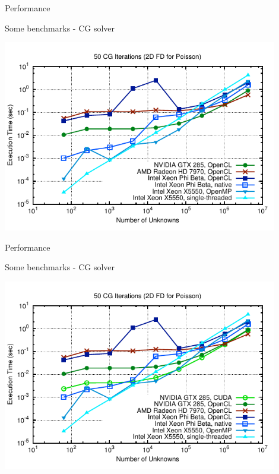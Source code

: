 \begin{frame}{Performance}
\begin{block}{Some benchmarks - CG solver}
  \begin{center}
   \includegraphics[width=0.9\textwidth]{figs/cg-timings-6}
  \end{center}
\end{block}
\end{frame}

\begin{frame}{Performance}
\begin{block}{Some benchmarks - CG solver}
  \begin{center}
   \includegraphics[width=0.9\textwidth]{figs/cg-timings-7}
  \end{center}
\end{block}
\end{frame}



